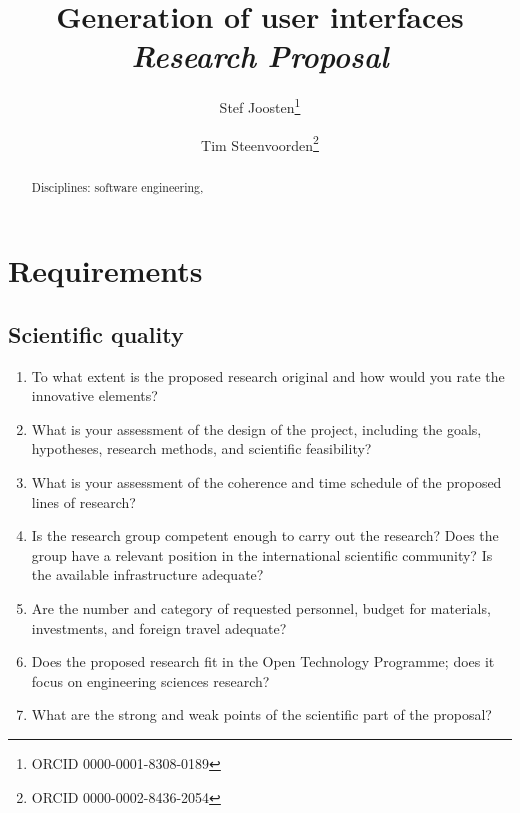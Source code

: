 \documentclass{elsarticle}
\begin{document}
% 

\title{Generation of user interfaces\\{\em\normalsize Research Proposal}}
\author{Stef Joosten\footnote{ORCID 0000-0001-8308-0189}}
\author{Tim Steenvoorden\footnote{ORCID 0000-0002-8436-2054}}
\address{Open Universiteit Nederland, Heerlen, the Netherlands}

\begin{abstract}
Disciplines: software engineering, 
\end{abstract}

\begin{keyword}
\end{keyword}
\maketitle

\section{Requirements}
\subsection{Scientific quality}
\begin{enumerate}
   \item 	To what extent is the proposed research original and how would you rate the innovative elements?
   \item 	What is your assessment of the design of the project, including the goals, hypotheses, research methods, and scientific feasibility?
   \item 	What is your assessment of the coherence and time schedule of the proposed lines of research?
   \item 	Is the research group competent enough to carry out the research? Does the group have a relevant position in the international scientific community? Is the available infrastructure adequate?
   \item 	Are the number and category of requested personnel, budget for materials, investments, and foreign travel adequate?
   \item 	Does the proposed research fit in the Open Technology Programme; does it focus on engineering sciences research?
   \item 	What are the strong and weak points of the scientific part of the proposal?   
\end{enumerate}
\end{document}
